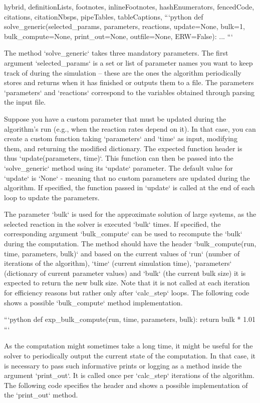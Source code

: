 \begin{markdown*}{%
  hybrid,
  definitionLists,
  footnotes,
  inlineFootnotes,
  hashEnumerators,
  fencedCode,
  citations,
  citationNbsps,
  pipeTables,
  tableCaptions,
}
```python
def solve_generic(selected_params, parameters, reactions, update=None, 
                  bulk=1, bulk_compute=None, print_out=None, outfile=None, 
                  ERW=False):
    ...
```

The method `solve_generic` takes three mandatory parameters. The first argument `selected_params` is a set or list of parameter names you want to keep track of during the simulation -- these are the ones the algorithm periodically stores and returns when it has finished or outputs them to a file. The parameters `parameters` and `reactions` correspond to the variables obtained through parsing the input file. 

Suppose you have a custom parameter that must be updated during the algorithm's run (e.g., when the reaction rates depend on it). In that case, you can create a
custom function taking `parameters` and `time` as input, modifying them, and returning
the modified dictionary. The expected function header is thus `update(parameters, time)`. This function can then be passed into the `solve_generic` method using its `update` parameter. The default value for `update` is `None` - meaning that no custom parameters are updated during the algorithm. If specified, the function passed in `update` is called at the end of each loop to update the parameters.

The parameter `bulk` is used for the approximate solution of large systems, as the selected reaction in the solver is executed `bulk` times. If specified, the corresponding argument `bulk_compute` can be used to recompute the `bulk` during the computation. The method should have the header `bulk_compute(run, time, parameters, bulk)` and based on the current values of `run` (number of iterations of the algorithm), `time` (current simulation time), `parameters` (dictionary of current parameter values) and `bulk` (the current bulk size) it is expected to return the new bulk size. Note that it is not called at each iteration for efficiency reasons but rather only after `calc_step` loops. The following code shows a possible `bulk_compute` method implementation.

```python
def exp_bulk_compute(run, time, parameters, bulk):
    return bulk * 1.01
```

As the computation might sometimes take a long time, it might be useful for the solver to periodically output the current state of the computation. In that case, it is necessary to pass such informative prints or logging as a method inside the argument `print_out`. It is called once per `calc_step` iterations of the algorithm. The following code specifies the header and shows a possible implementation of the `print_out` method.


\end{markdown*}
